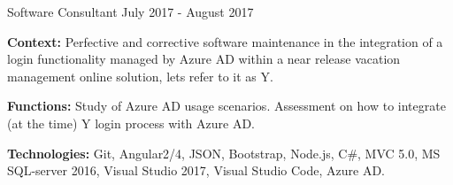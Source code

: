 \begin{cventries}
  \cventry
    {Software Consultant} %
    {} %
    {} %
    {July 2017 - August 2017} %
    {
      \begin{cvitems} %
		\item {\textbf{Context:} Perfective and corrective software maintenance in the integration of a login functionality managed by Azure AD within a near release vacation management online solution, lets refer to it as Y.}
		\item {\textbf{Functions:} Study of Azure AD usage scenarios. Assessment on how to integrate (at the time) Y login process with Azure AD.}		
		\item {\textbf{Technologies:} Git, Angular2/4, JSON, Bootstrap, Node.js, C\#, MVC 5.0, MS SQL-server 2016, Visual Studio 2017, Visual Studio Code, Azure AD.}
      \end{cvitems}
    }   


\end{cventries}
